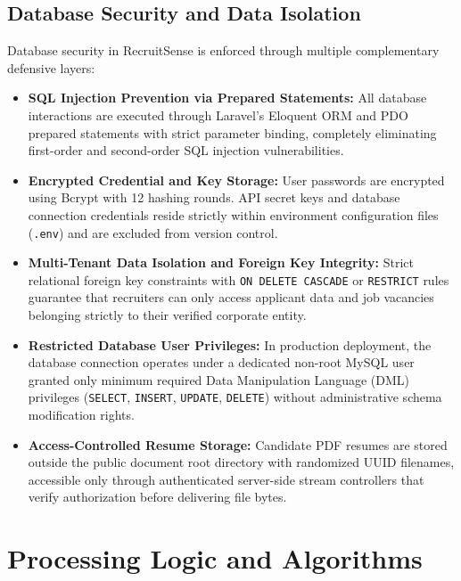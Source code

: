 \subsection{Database Security and Data Isolation}
Database security in RecruitSense is enforced through multiple complementary defensive layers:
\begin{itemize}
    \item \textbf{SQL Injection Prevention via Prepared Statements:} All database interactions are executed through Laravel's Eloquent ORM and PDO prepared statements with strict parameter binding, completely eliminating first-order and second-order SQL injection vulnerabilities.
    \item \textbf{Encrypted Credential and Key Storage:} User passwords are encrypted using Bcrypt with 12 hashing rounds. API secret keys and database connection credentials reside strictly within environment configuration files (\texttt{.env}) and are excluded from version control.
    \item \textbf{Multi-Tenant Data Isolation and Foreign Key Integrity:} Strict relational foreign key constraints with \texttt{ON DELETE CASCADE} or \texttt{RESTRICT} rules guarantee that recruiters can only access applicant data and job vacancies belonging strictly to their verified corporate entity.
    \item \textbf{Restricted Database User Privileges:} In production deployment, the database connection operates under a dedicated non-root MySQL user granted only minimum required Data Manipulation Language (DML) privileges (\texttt{SELECT}, \texttt{INSERT}, \texttt{UPDATE}, \texttt{DELETE}) without administrative schema modification rights.
    \item \textbf{Access-Controlled Resume Storage:} Candidate PDF resumes are stored outside the public document root directory with randomized UUID filenames, accessible only through authenticated server-side stream controllers that verify authorization before delivering file bytes.
\end{itemize}

\section{Processing Logic and Algorithms}

